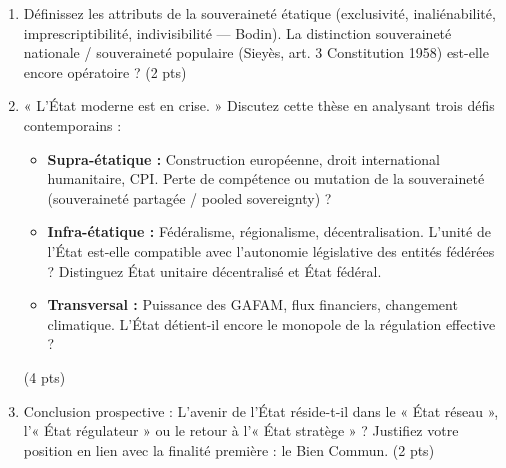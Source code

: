 \documentclass[11pt]{article}
\begin{document}
\begin{exercice}
\begin{enumerate}
    \item Définissez les attributs de la souveraineté étatique (exclusivité, inaliénabilité, imprescriptibilité, indivisibilité — Bodin). La distinction souveraineté nationale / souveraineté populaire (Sieyès, art. 3 Constitution 1958) est-elle encore opératoire ? (2 pts)
    \item « L'État moderne est en crise. » Discutez cette thèse en analysant trois défis contemporains :
    \begin{itemize}
        \item \textbf{Supra-étatique :} Construction européenne, droit international humanitaire, CPI. Perte de compétence ou mutation de la souveraineté (souveraineté partagée / pooled sovereignty) ?
        \item \textbf{Infra-étatique :} Fédéralisme, régionalisme, décentralisation. L'unité de l'État est-elle compatible avec l'autonomie législative des entités fédérées ? Distinguez État unitaire décentralisé et État fédéral.
        \item \textbf{Transversal :} Puissance des GAFAM, flux financiers, changement climatique. L'État détient-il encore le monopole de la régulation effective ?
    \end{itemize}
    (4 pts)
    \item Conclusion prospective : L'avenir de l'État réside-t-il dans le « État réseau », l'« État régulateur » ou le retour à l'« État stratège » ? Justifiez votre position en lien avec la finalité première : le Bien Commun. (2 pts)
\end{enumerate}
\end{exercice}
\end{document}
